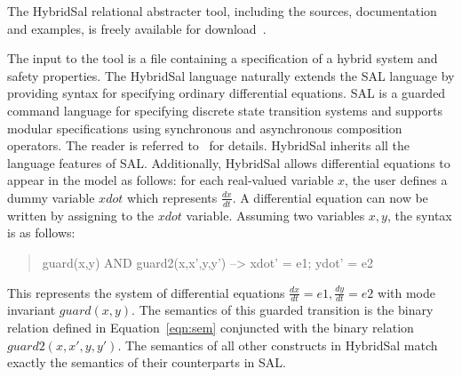 \documentclass{llncs}
\begin{document}
The HybridSal relational abstracter tool, including
the sources, documentation and examples, is freely available
for download~\cite{hsalrelabs}.

The input to the tool is a file containing a 
specification of a hybrid system and safety
properties.  The HybridSal language naturally
extends the SAL language by providing syntax for
specifying ordinary differential equations.
SAL is a guarded command language for specifying
discrete state transition systems and supports
modular specifications using synchronous and
asynchronous composition operators.  The reader
is referred to~\cite{SAL-language} for details.
HybridSal inherits all the language features of
SAL.  Additionally, HybridSal allows 
differential equations to appear in the model as follows:
for each real-valued variable $x$, the user 
defines a dummy variable $xdot$
which represents $\frac{dx}{dt}$.  A differential
equation can now be written by assigning to
the $xdot$ variable.
Assuming two variables $x,y$, the syntax is as follows:
\begin{quote}
\begin{tt}
 guard(x,y) AND guard2(x,x',y,y') --> xdot' = e1; ydot' = e2
\end{tt}
\end{quote}
This represents the system of differential equations
$\frac{dx}{dt} = e1, \frac{dy}{dt} = e2$ with
mode invariant $\mathit{guard}(x,y)$.
The semantics of this guarded transition is the binary
relation defined in Equation~\ref{eqn:sem} conjuncted with
the binary relation $\mathit{guard2}(x,x',y,y')$.
The semantics of all other constructs in HybridSal match
exactly the semantics of their counterparts in SAL.
\end{document}
